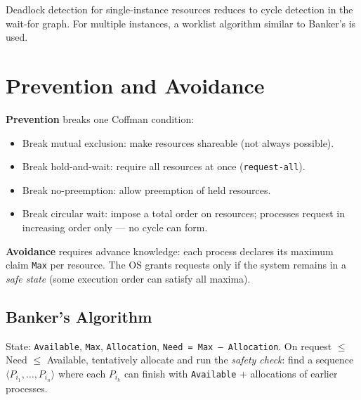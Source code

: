 Deadlock detection for single-instance resources reduces to cycle detection in
the wait-for graph. For multiple instances, a worklist algorithm similar to
Banker's is used.

\section{Prevention and Avoidance}
\label{sec:prevention-avoidance}

\textbf{Prevention} breaks one Coffman condition:
\begin{itemize}
  \item Break mutual exclusion: make resources shareable (not always possible).
  \item Break hold-and-wait: require all resources at once (\texttt{request-all}).
  \item Break no-preemption: allow preemption of held resources.
  \item Break circular wait: impose a total order on resources; processes
        request in increasing order only --- no cycle can form.
\end{itemize}

\textbf{Avoidance} requires advance knowledge: each process declares its maximum
claim \texttt{Max} per resource. The OS grants requests only if the system
remains in a \emph{safe state} (some execution order can satisfy all maxima).

\subsection{Banker's Algorithm}
State: \texttt{Available}, \texttt{Max}, \texttt{Allocation},
\texttt{Need = Max -- Allocation}. On request $\le$ Need $\le$ Available,
tentatively allocate and run the \emph{safety check}: find a sequence
$\langle P_{i_1},\dots,P_{i_n}\rangle$ where each $P_{i_k}$ can finish with
\texttt{Available} $+$ allocations of earlier processes.

